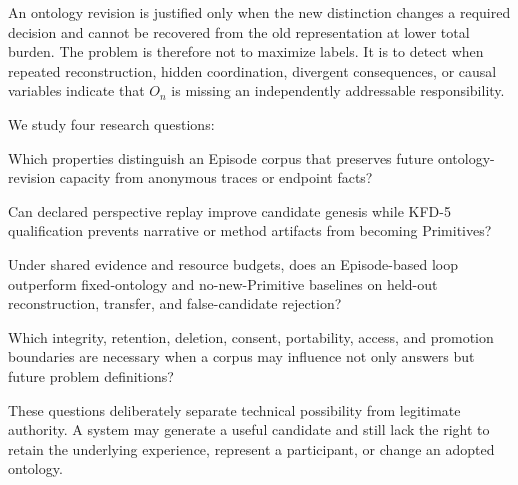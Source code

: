 An ontology revision is justified only when the new distinction changes a
required decision and cannot be recovered from the old representation at lower
total burden. The problem is therefore not to maximize labels. It is to detect
when repeated reconstruction, hidden coordination, divergent consequences, or
causal variables indicate that $O_n$ is missing an independently addressable
responsibility.

We study four research questions:

\begin{description}[leftmargin=2.1em,style=nextline]
  \item[RQ1: Representation.] Which properties distinguish an Episode corpus
  that preserves future ontology-revision capacity from anonymous traces or
  endpoint facts?
  \item[RQ2: Mechanism.] Can declared perspective replay improve candidate
  genesis while KFD-5 qualification prevents narrative or method artifacts
  from becoming Primitives?
  \item[RQ3: Evaluation.] Under shared evidence and resource budgets, does an
  Episode-based loop outperform fixed-ontology and no-new-Primitive baselines
  on held-out reconstruction, transfer, and false-candidate rejection?
  \item[RQ4: Governance.] Which integrity, retention, deletion, consent,
  portability, access, and promotion boundaries are necessary when a corpus
  may influence not only answers but future problem definitions?
\end{description}

These questions deliberately separate technical possibility from legitimate
authority. A system may generate a useful candidate and still lack the right
to retain the underlying experience, represent a participant, or change an
adopted ontology.
